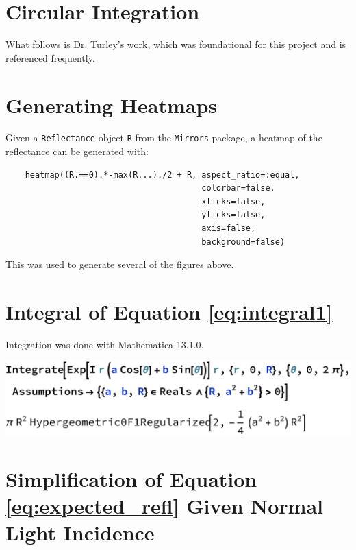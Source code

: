 \documentclass[etd,twoside,senior,noacknowledgments]{BYUPhys}
\begin{document}
\begin{appendices}

  \chapter{Circular Integration}\label{chap:circular_integration}
  
  What follows is Dr. Turley's work, which was foundational for this project and is referenced frequently.
  
  
  
  
  
  \chapter{Generating Heatmaps}\label{chap:heatmap_code}
  
  Given a \texttt{Reflectance} object \texttt{R} from the \texttt{Mirrors} package, a heatmap of the reflectance can be generated with:
  
  \begin{verbatim}
    heatmap((R.==0).*-max(R...)./2 + R, aspect_ratio=:equal,
                                        colorbar=false,
                                        xticks=false,
                                        yticks=false,
                                        axis=false,
                                        background=false)
  \end{verbatim}
  
  This was used to generate several of the figures above.
  
  
  
  \chapter{Integral of Equation \ref{eq:integral1}}\label{chap:integral}
  
  Integration was done with Mathematica 13.1.0.
  
  \includegraphics[width=\textwidth]{nasty-integral.pdf}
  
  
  
  \chapter{Simplification of Equation \ref{eq:expected_refl} Given Normal Light Incidence}\label{chap:airy_validation}
  

\end{appendices}
\end{document}
